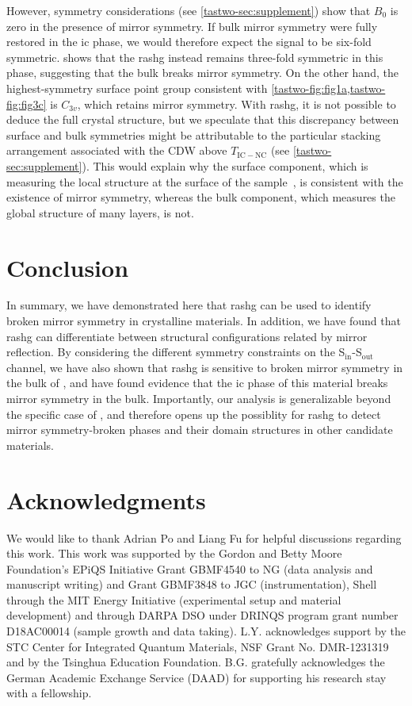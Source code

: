 However, symmetry considerations (see \cref{tastwo-sec:supplement}) show that $B_0$ is zero in the presence of mirror symmetry.
If bulk mirror symmetry were fully restored in the \gls{ic} phase, we would therefore expect the signal to be six-fold symmetric.
 shows that the \gls{rashg} instead remains three-fold symmetric in this phase, suggesting that the bulk breaks mirror symmetry.
On the other hand, the highest-symmetry surface point group consistent with \cref{tastwo-fig:fig1a,tastwo-fig:fig3c} is $C_{3v}$, which retains mirror symmetry.
With \gls{rashg}, it is not possible to deduce the full crystal structure, but we speculate that this discrepancy between surface and bulk symmetries might be attributable to the particular stacking arrangement associated with the CDW above $T_{\mathrm{IC-NC}}$ (see \cref{tastwo-sec:supplement}).
This would explain why the surface component, which is measuring the local structure at the surface of the sample~\citep{bloembergen_optical_1968}, is consistent with the existence of mirror symmetry, whereas the bulk component, which measures the global structure of many layers, is not.

\section{Conclusion}

In summary, we have demonstrated here that \gls{rashg} can be used to identify broken mirror symmetry in crystalline materials.
In addition, we have found that \gls{rashg} can differentiate between structural configurations related by mirror reflection.
By considering the different symmetry constraints on the S$_\mathrm{in}$-S$_\mathrm{out}$ channel, we have also shown that \gls{rashg} is sensitive to broken mirror symmetry in the bulk of \tastwo, and have found evidence that the \gls{ic} phase of this material breaks mirror symmetry in the bulk.
Importantly, our analysis is generalizable beyond the specific case of \tastwo, and therefore opens up the possiblity for \gls{rashg} to detect mirror symmetry-broken phases and their domain structures in other candidate materials.

\section{Acknowledgments}

We would like to thank Adrian Po and Liang Fu for helpful discussions regarding this work.
This work was supported by the Gordon and Betty Moore Foundation’s EPiQS Initiative Grant GBMF4540 to NG (data analysis and manuscript writing) and Grant GBMF3848 to JGC (instrumentation), Shell through the MIT Energy Initiative (experimental setup and material development) and through DARPA DSO under DRINQS program grant number D18AC00014 (sample growth and data taking).
L.Y. acknowledges support by the STC Center for Integrated Quantum Materials, NSF Grant No. DMR-1231319 and by the Tsinghua Education Foundation.
B.G. gratefully acknowledges the German Academic Exchange Service (DAAD) for supporting his research stay with a fellowship.

